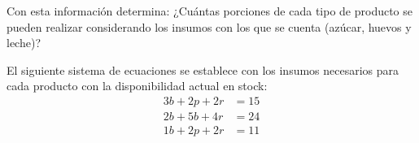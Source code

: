 \documentclass[12pt]{article}
\begin{document}
\begin{enumerate}
    Con esta información determina: ¿Cuántas porciones de cada tipo de producto se pueden realizar considerando los insumos con los que se cuenta (azúcar, huevos y leche)?

    El siguiente sistema de ecuaciones se establece con los insumos necesarios para cada producto con la disponibilidad actual en stock:
    \begin{align*}
        3b + 2p +2r &= 15 \\
        2b + 5b + 4r &= 24 \\
        1b + 2p +2r &= 11
    \end{align*}
\end{enumerate}



\end{document}
